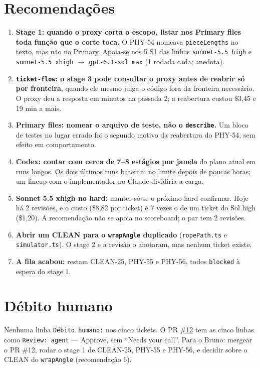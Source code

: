 \documentclass[11pt,a4paper]{article}
\begin{document}
\section{Recomendações}
\begin{enumerate}
  \item \textbf{Stage 1: quando o proxy corta o escopo, listar nos Primary
        files toda função que o corte toca.} O PHY-54 nomeava
        \texttt{pieceLengths} no texto, mas não no Primary. Apoia-se nos 5 S1
        das linhas \texttt{sonnet-5.5 high} e \texttt{sonnet-5.5 xhigh}
        $\to$ \texttt{gpt-6.1-sol max} (1 rodada cada; anedota).
  \item \textbf{\texttt{ticket-flow}: o stage 3 pode consultar o proxy antes
        de reabrir só por fronteira}, quando ele mesmo julga o código fora da
        fronteira necessário. O proxy deu a resposta em minutos na passada 2; a
        reabertura custou \$3,45 e 19 min a mais.
  \item \textbf{Primary files: nomear o arquivo de teste, não o
        \texttt{describe}.} Um bloco de testes no lugar errado foi o segundo
        motivo da reabertura do PHY-54, sem efeito em comportamento.
  \item \textbf{Codex: contar com cerca de 7--8 estágios por janela} do plano
        atual em runs longos. Os dois últimos runs bateram no limite depois de
        poucas horas; um lineup com o implementador no Claude dividiria a
        carga.
  \item \textbf{Sonnet 5.5 xhigh no hard:} manter só se o próximo hard
        confirmar. Hoje há 2 revisões, e o custo (\$8,82 por ticket) é 7 vezes
        o de um ticket do Sol high (\$1,20). A recomendação não se apoia no
        scoreboard; o par tem 2 revisões.
  \item \textbf{Abrir um CLEAN para o \texttt{wrapAngle} duplicado}
        (\texttt{ropePath.ts} e \texttt{simulator.ts}). O stage 2 e a revisão
        o anotaram, mas nenhum ticket existe.
  \item \textbf{A fila acabou:} restam CLEAN-25, PHY-55 e PHY-56, todos
        \texttt{blocked} à espera do stage 1.
\end{enumerate}

\section{Débito humano}

Nenhuma linha \texttt{Débito humano:} nos cinco tickets. O PR
\href{https://github.com/Laginho/PhysiSyst/pull/12}{\#12} tem as cinco linhas
como \texttt{Review: agent} --- Approve, sem ``Needs your call''. Para o Bruno:
mergear o PR \#12, rodar o stage 1 de CLEAN-25, PHY-55 e PHY-56, e decidir
sobre o CLEAN do \texttt{wrapAngle} (recomendação 6).
\end{document}
